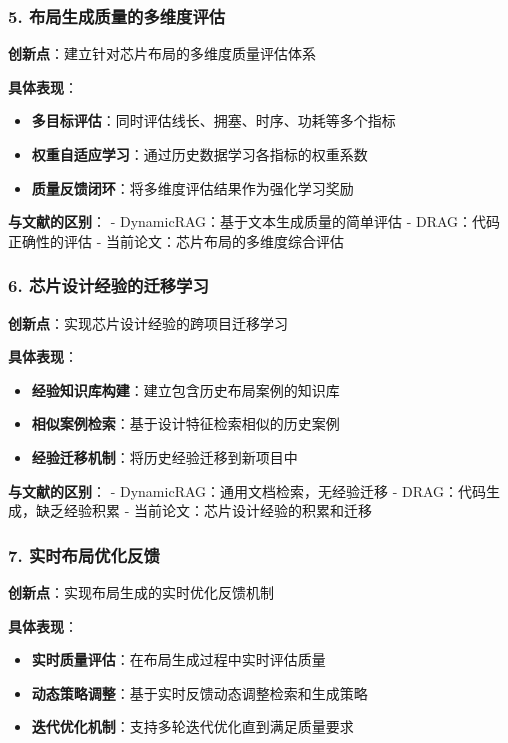 \documentclass{ctexart}
\begin{document}
\subsubsection{5. 布局生成质量的多维度评估}

\textbf{创新点}：建立针对芯片布局的多维度质量评估体系

\textbf{具体表现}：
\begin{itemize}
    \item \textbf{多目标评估}：同时评估线长、拥塞、时序、功耗等多个指标
    \item \textbf{权重自适应学习}：通过历史数据学习各指标的权重系数
    \item \textbf{质量反馈闭环}：将多维度评估结果作为强化学习奖励
\end{itemize}

\textbf{与文献的区别}：
- DynamicRAG：基于文本生成质量的简单评估
- DRAG：代码正确性的评估
- 当前论文：芯片布局的多维度综合评估

\subsubsection{6. 芯片设计经验的迁移学习}

\textbf{创新点}：实现芯片设计经验的跨项目迁移学习

\textbf{具体表现}：
\begin{itemize}
    \item \textbf{经验知识库构建}：建立包含历史布局案例的知识库
    \item \textbf{相似案例检索}：基于设计特征检索相似的历史案例
    \item \textbf{经验迁移机制}：将历史经验迁移到新项目中
\end{itemize}

\textbf{与文献的区别}：
- DynamicRAG：通用文档检索，无经验迁移
- DRAG：代码生成，缺乏经验积累
- 当前论文：芯片设计经验的积累和迁移

\subsubsection{7. 实时布局优化反馈}

\textbf{创新点}：实现布局生成的实时优化反馈机制

\textbf{具体表现}：
\begin{itemize}
    \item \textbf{实时质量评估}：在布局生成过程中实时评估质量
    \item \textbf{动态策略调整}：基于实时反馈动态调整检索和生成策略
    \item \textbf{迭代优化机制}：支持多轮迭代优化直到满足质量要求
\end{itemize}
\end{document}
